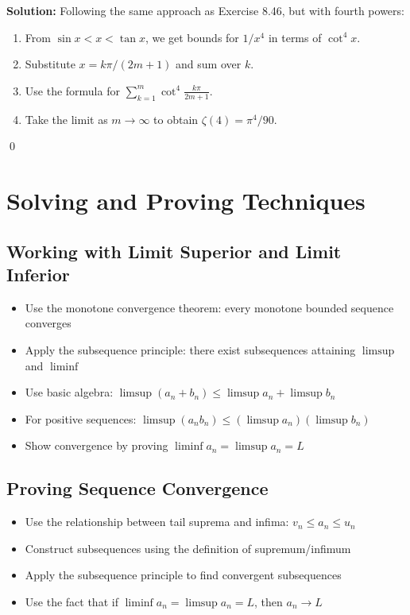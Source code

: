 \bigskip\noindent\textbf{Solution:}
Following the same approach as Exercise 8.46, but with fourth powers:
\begin{enumerate}
\item From \(\sin x < x < \tan x\), we get bounds for \(1/x^4\) in terms of \(\cot^4 x\).
\item Substitute \(x = k\pi/(2m + 1)\) and sum over \(k\).
\item Use the formula for \(\sum_{k=1}^m \cot^4 \frac{k\pi}{2m + 1}\).
\item Take the limit as \(m \to \infty\) to obtain \(\zeta(4) = \pi^4/90\).
\end{enumerate}
\qed

\section{Solving and Proving Techniques}

\subsection*{Working with Limit Superior and Limit Inferior}
\begin{itemize}
\item Use the monotone convergence theorem: every monotone bounded sequence converges
\item Apply the subsequence principle: there exist subsequences attaining $\limsup$ and $\liminf$
\item Use basic algebra: $\limsup(a_n+b_n) \le \limsup a_n + \limsup b_n$
\item For positive sequences: $\limsup(a_n b_n) \le (\limsup a_n)(\limsup b_n)$
\item Show convergence by proving $\liminf a_n = \limsup a_n = L$
\end{itemize}

\subsection*{Proving Sequence Convergence}
\begin{itemize}
\item Use the relationship between tail suprema and infima: $v_n \le a_n \le u_n$
\item Construct subsequences using the definition of supremum/infimum
\item Apply the subsequence principle to find convergent subsequences
\item Use the fact that if $\liminf a_n = \limsup a_n = L$, then $a_n \to L$
\end{itemize}

